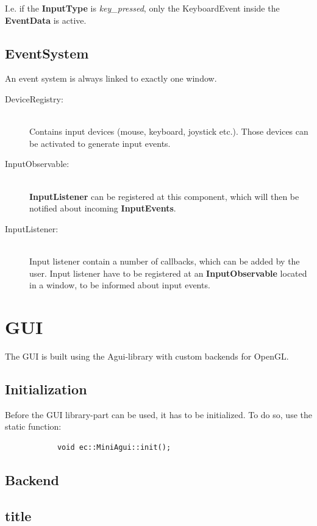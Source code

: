 \documentclass[12p, paper=a4, leqno, colorinlistoftodos]{article}
\begin{document}
		I.e. if the \textbf{InputType} is \textit{key\_pressed}, only the KeyboardEvent inside the \textbf{EventData} is active.

		\subsection{EventSystem}
		An event system is always linked to exactly one window. 
		\begin{description}
			\item[DeviceRegistry:] \hfill\\
				Contains input devices (mouse, keyboard, joystick etc.). Those devices can be activated to generate input events.
			\item[InputObservable:] \hfill\\
				\textbf{InputListener} can be registered at this component, which will then be notified about incoming \textbf{InputEvents}.
			\item[InputListener:] \hfill\\
				Input listener contain a number of callbacks, which can be added by the user. Input listener have to be registered at an \textbf{InputObservable} located in a window, to be informed about input events.	
		\end{description}
		
			
	
	\pagebreak
	\section{GUI}
	The GUI is built using the Agui-library with custom backends for OpenGL.
	
		\subsection{Initialization}
		Before the GUI library-part can be used, it has to be initialized. To do so, use the static function:
		\begin{lstlisting}
			void ec::MiniAgui::init();
		\end{lstlisting}
		
		\subsection{Backend}
		
		\subsection{title}
		
		
	\pagebreak
	
	
	
	
	\newpage
	\appendix
	\listoffigures
	\listoftables
	
	
\end{document}
